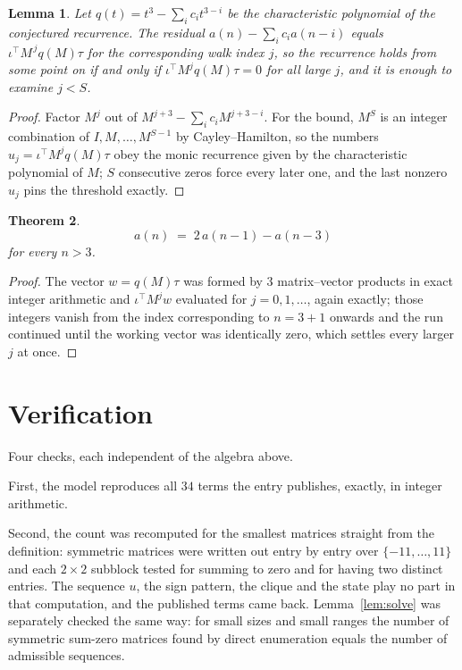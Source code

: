 \documentclass[11pt,a4paper]{article}
\theoremstyle{plain}
\newtheorem{theorem}{Theorem}
\newtheorem{lemma}[theorem]{Lemma}
\theoremstyle{definition}
\begin{document}
\begin{lemma}\label{lem:crit}
Let $q(t)=t^{3}-\sum_i c_it^{3-i}$ be the characteristic polynomial of the
conjectured recurrence. The residual $a(n)-\sum_ic_ia(n-i)$ equals
$\iota^{\!\top}M^{\,j}q(M)\tau$ for the corresponding walk index $j$, so the recurrence
holds from some point on if and only if $\iota^{\!\top}M^{j}q(M)\tau=0$ for all large $j$,
and it is enough to examine $j<S$.
\end{lemma}

\begin{proof}
Factor $M^{j}$ out of $M^{j+3}-\sum_ic_iM^{j+3-i}$. For the bound, $M^{S}$
is an integer combination of $I,M,\dots,M^{S-1}$ by Cayley--Hamilton, so the numbers
$u_j=\iota^{\!\top}M^{j}q(M)\tau$ obey the monic recurrence given by the characteristic
polynomial of $M$; $S$ consecutive zeros force every later one, and the last nonzero $u_j$
pins the threshold exactly.
\end{proof}

\begin{theorem}
\[
a(n)\;=\;2\,a(n-1) - a(n-3)
\]
for every $n>3$.
\end{theorem}

\begin{proof}
The vector $w=q(M)\tau$ was formed by $3$ matrix--vector products in exact integer
arithmetic and $\iota^{\!\top}M^{j}w$ evaluated for $j=0,1,\dots$, again exactly; those
integers vanish from the index corresponding to $n=3+1$ onwards and the run continued
until the working vector was identically zero, which settles every larger $j$ at once.
\end{proof}

\section{Verification}

Four checks, each independent of the algebra above.

First, the model reproduces all $34$ terms the entry publishes, exactly, in integer
arithmetic.

Second, the count was recomputed for the smallest matrices straight from the definition:
symmetric matrices were written out entry by entry over $\{-11,\dots,11\}$ and each
$2\times2$ subblock tested for summing to zero and for having two distinct entries. The
sequence $u$, the sign pattern, the clique and the state play no part in that computation, and
the published terms came back. Lemma~\ref{lem:solve} was separately checked the same way: for
small sizes and small ranges the number of symmetric sum-zero matrices found by direct
enumeration equals the number of admissible sequences.
\end{document}
